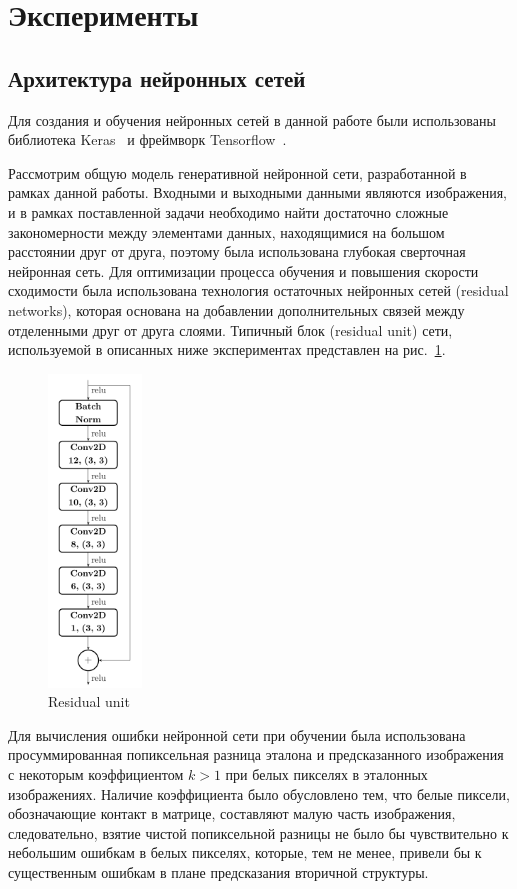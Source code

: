 \documentclass[14pt]{matmex-diploma-custom}
\begin{document}
\section{Эксперименты}
\subsection{Архитектура нейронных сетей}
Для создания и обучения нейронных сетей в данной работе были использованы библиотека Keras~\cite{chollet2015keras} и фреймворк Tensorflow~\cite{tensorflow2015-whitepaper}.

Рассмотрим общую модель генеративной нейронной сети, разработанной в рамках данной работы. Входными и выходными данными являются изображения, и в рамках поставленной задачи необходимо найти достаточно сложные закономерности между элементами данных, находящимися на большом расстоянии друг от друга, поэтому была использована глубокая сверточная нейронная сеть. Для оптимизации процесса обучения и повышения скорости сходимости была использована технология остаточных нейронных сетей (residual networks), которая основана на добавлении дополнительных связей между отделенными друг от друга слоями. Типичный блок (residual unit) сети, используемой в описанных ниже экспериментах представлен на рис.~\ref{unit}.

\begin{figure}[h]
\begin{center}
\centering
\includegraphics[width=2.5cm]{pics/res_unit.pdf}
\caption{Residual unit}
\label{unit}
\end{center}
\end{figure} 

Для вычисления ошибки нейронной сети при обучении была использована просуммированная попиксельная разница эталона и предсказанного изображения с некоторым коэффициентом $k > 1$ при белых пикселях в эталонных изображениях. Наличие коэффициента было обусловлено тем, что белые пиксели, обозначающие контакт в матрице, составляют малую часть изображения, следовательно, взятие чистой попиксельной разницы не было бы чувствительно к небольшим ошибкам в белых пикселях, которые, тем не менее, привели бы к существенным ошибкам в плане предсказания вторичной структуры. 
\end{document}

